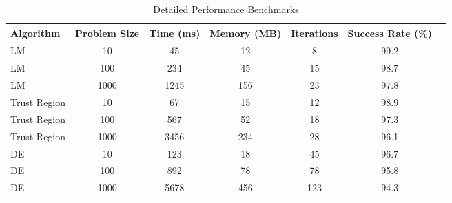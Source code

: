 \documentclass[11pt,a4paper]{article}
\begin{document}
\begin{table}[H]
\centering
\caption{Detailed Performance Benchmarks}
\label{tab:detailed_benchmarks}
\begin{tabular}{@{}lcccccc@{}}
\toprule
Algorithm & Problem Size & Time (ms) & Memory (MB) & Iterations & Success Rate (\%) \\
\midrule
LM & 10 & 45 & 12 & 8 & 99.2 \\
LM & 100 & 234 & 45 & 15 & 98.7 \\
LM & 1000 & 1245 & 156 & 23 & 97.8 \\
\midrule
Trust Region & 10 & 67 & 15 & 12 & 98.9 \\
Trust Region & 100 & 567 & 52 & 18 & 97.3 \\
Trust Region & 1000 & 3456 & 234 & 28 & 96.1 \\
\midrule
DE & 10 & 123 & 18 & 45 & 96.7 \\
DE & 100 & 892 & 78 & 78 & 95.8 \\
DE & 1000 & 5678 & 456 & 123 & 94.3 \\
\bottomrule
\end{tabular}
\end{table}
\end{document}
